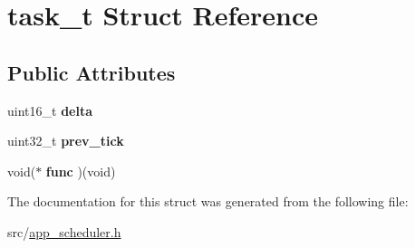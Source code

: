 \hypertarget{structtask__t}{}\section{task\+\_\+t Struct Reference}
\label{structtask__t}
\subsection*{Public Attributes}
\begin{DoxyCompactItemize}
\item 
\mbox{\label{structtask__t_afb639c6af260e6e4238afb91b18fc810}} 
uint16\+\_\+t {\bfseries delta}
\item 
\mbox{\label{structtask__t_abe80b8f8e982e4e938fcc34eaee67fb3}} 
uint32\+\_\+t {\bfseries prev\+\_\+tick}
\item 
\mbox{\label{structtask__t_a04b28fdc153e1fd9a8f79283e4009391}} 
void($\ast$ {\bfseries func} )(void)
\end{DoxyCompactItemize}


The documentation for this struct was generated from the following file\+:\begin{DoxyCompactItemize}
\item 
src/\mbox{\hyperlink{app__scheduler_8h}{app\+\_\+scheduler.\+h}}\end{DoxyCompactItemize}
